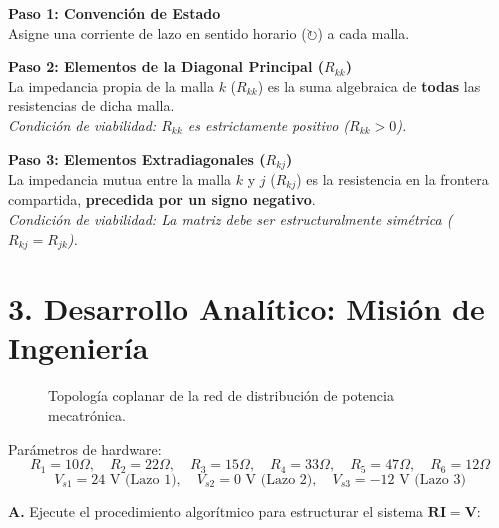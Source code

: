 \documentclass[11pt,a4paper]{article}
\begin{document}
\begin{tcolorbox}[colback=blue!5!white,colframe=UCBblue,title=\textbf{Procedimiento de Ensamblaje Matricial}]
\textbf{Paso 1: Convención de Estado} \\
Asigne una corriente de lazo en sentido horario ($\circlearrowright$) a cada malla.

\vspace{0.2cm}
\textbf{Paso 2: Elementos de la Diagonal Principal ($R_{kk}$)} \\
La impedancia propia de la malla $k$ ($R_{kk}$) es la suma algebraica de \textbf{todas} las resistencias de dicha malla. \\
\textit{Condición de viabilidad: $R_{kk}$ es estrictamente positivo ($R_{kk} > 0$).}

\vspace{0.2cm}
\textbf{Paso 3: Elementos Extradiagonales ($R_{kj}$)} \\
La impedancia mutua entre la malla $k$ y $j$ ($R_{kj}$) es la resistencia en la frontera compartida, \textbf{precedida por un signo negativo}. \\
\textit{Condición de viabilidad: La matriz debe ser estructuralmente simétrica ($R_{kj} = R_{jk}$).}
\end{tcolorbox}

\newpage

\section*{3. Desarrollo Analítico: Misión de Ingeniería}

\begin{figure}[h!]
    \centering
    \caption{Topología coplanar de la red de distribución de potencia mecatrónica.}
\end{figure}

Parámetros de hardware:
$$R_1=10\Omega, \quad R_2=22\Omega, \quad R_3=15\Omega, \quad R_4=33\Omega, \quad R_5=47\Omega, \quad R_6=12\Omega$$
$$V_{s1} = 24\text{ V (Lazo 1)}, \quad V_{s2} = 0\text{ V (Lazo 2)}, \quad V_{s3} = -12\text{ V (Lazo 3)}$$

\textbf{A.} Ejecute el procedimiento algorítmico para estructurar el sistema $\mathbf{R}\mathbf{I} = \mathbf{V}$:

\vspace{0.5cm}
\end{document}
